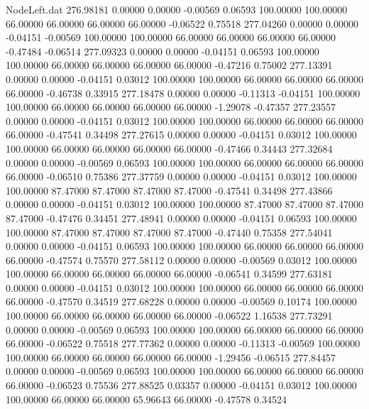 \begin{filecontents}{NodeLeft.dat}
 276.98181    0.00000    0.00000    -0.00569    0.06593  100.00000  100.00000   66.00000   66.00000   66.00000   66.00000   -0.06522    0.75518
 277.04260    0.00000    0.00000    -0.04151   -0.00569  100.00000  100.00000   66.00000   66.00000   66.00000   66.00000   -0.47484   -0.06514
 277.09323    0.00000    0.00000    -0.04151    0.06593  100.00000  100.00000   66.00000   66.00000   66.00000   66.00000   -0.47216    0.75002
 277.13391    0.00000    0.00000    -0.04151    0.03012  100.00000  100.00000   66.00000   66.00000   66.00000   66.00000   -0.46738    0.33915
 277.18478    0.00000    0.00000    -0.11313   -0.04151  100.00000  100.00000   66.00000   66.00000   66.00000   66.00000   -1.29078   -0.47357
 277.23557    0.00000    0.00000    -0.04151    0.03012  100.00000  100.00000   66.00000   66.00000   66.00000   66.00000   -0.47541    0.34498
 277.27615    0.00000    0.00000    -0.04151    0.03012  100.00000  100.00000   66.00000   66.00000   66.00000   66.00000   -0.47466    0.34443
 277.32684    0.00000    0.00000    -0.00569    0.06593  100.00000  100.00000   66.00000   66.00000   66.00000   66.00000   -0.06510    0.75386
 277.37759    0.00000    0.00000    -0.04151    0.03012  100.00000  100.00000   87.47000   87.47000   87.47000   87.47000   -0.47541    0.34498
 277.43866    0.00000    0.00000    -0.04151    0.03012  100.00000  100.00000   87.47000   87.47000   87.47000   87.47000   -0.47476    0.34451
 277.48941    0.00000    0.00000    -0.04151    0.06593  100.00000  100.00000   87.47000   87.47000   87.47000   87.47000   -0.47440    0.75358
 277.54041    0.00000    0.00000    -0.04151    0.06593  100.00000  100.00000   66.00000   66.00000   66.00000   66.00000   -0.47574    0.75570
 277.58112    0.00000    0.00000    -0.00569    0.03012  100.00000  100.00000   66.00000   66.00000   66.00000   66.00000   -0.06541    0.34599
 277.63181    0.00000    0.00000    -0.04151    0.03012  100.00000  100.00000   66.00000   66.00000   66.00000   66.00000   -0.47570    0.34519
 277.68228    0.00000    0.00000    -0.00569    0.10174  100.00000  100.00000   66.00000   66.00000   66.00000   66.00000   -0.06522    1.16538
 277.73291    0.00000    0.00000    -0.00569    0.06593  100.00000  100.00000   66.00000   66.00000   66.00000   66.00000   -0.06522    0.75518
 277.77362    0.00000    0.00000    -0.11313   -0.00569  100.00000  100.00000   66.00000   66.00000   66.00000   66.00000   -1.29456   -0.06515
 277.84457    0.00000    0.00000    -0.00569    0.06593  100.00000  100.00000   66.00000   66.00000   66.00000   66.00000   -0.06523    0.75536
 277.88525    0.03357    0.00000    -0.04151    0.03012  100.00000  100.00000   66.00000   66.00000   65.96643   66.00000   -0.47578    0.34524

\end{filecontents}
